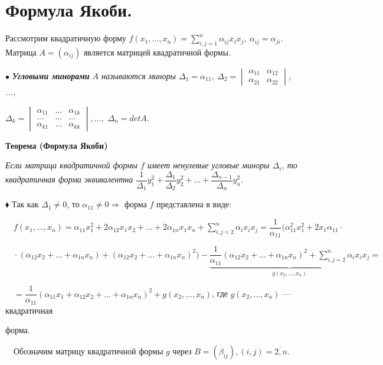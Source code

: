 \documentclass[a4paper, 12pt]{report}
\begin{document}
	
	
	
	
	
	\section{Формула Якоби.}
	
	\quad\;Рассмотрим квадратичную форму $f(x_1,...,x_n) =\sum\limits^n_{i,j=1}\alpha_{ij}x_ix_j,\ \alpha_{ij} = \alpha_{ji}.$ Матрица $A = (\alpha_{ij})$ является матрицей квадратичной формы.
	
	$\bullet$\textit{\textbf{ Угловыми минорами} $A$ называются миноры $\Delta_1 = \alpha_{11},\ \Delta_2 = \begin{vmatrix} \alpha_{11} & \alpha_{12}\\ \alpha_{21} & \alpha_{22} \end{vmatrix}$, ...,}
	
	\quad$\Delta_k = \begin{vmatrix} \alpha_{11} & ... & \alpha_{1k}\\ ...&...&... \\ \alpha_{k1} & ... & \alpha_{kk} \end{vmatrix}, ...,$ $\Delta_n = det A$.
	\par\bigskip
	\textbf{Теорема (Формула Якоби)}
	
	\textit{Если матрица квадратичной формы $f$ имеет ненулевые угловые миноры $\Delta_i$, то квадратичная форма эквивалентна $\dfrac{1}{\Delta_1}y_1^2+\dfrac{\Delta_1}{\Delta_2}y_2^2+...+\dfrac{\Delta_{n-1}}{\Delta_n}y_n^2$}.
	\par\bigskip
	$\blacklozenge$ Так как $\Delta_1 \ne 0$, то $\alpha_{11}\ne0\Rightarrow$ форма $f$ представлена в виде:
	
	$\quad f(x_1,...,x_n) = \alpha_{11}x_1^2 + 2\alpha_{12}x_1x_2 + ... + 2\alpha_{1n} x_1 x_n + \sum\limits^n_{i,j=2}\alpha_{i}x_ix_j = \dfrac{1}{\alpha_{11}}(\alpha_{11}^2x_1^2 + 2x_1\alpha_{11}\cdot$
	
	$\quad\cdot(\alpha_{12}x_2 + ... + \alpha_{1n}x_n) + (\alpha_{12}x_2 + ... + \alpha_{1n}x_n)^2) - \underbrace{\dfrac{1}{\alpha_{11}}(\alpha_{12}x_2 + ... + \alpha_{1n}x_n)^2 + \sum\limits^n_{i,j=2}\alpha_{i}x_ix_j}_{g(x_2,...,x_n)} =$
	
	$\quad=\dfrac{1}{\alpha_{11}}(\alpha_{11}x_1 + \alpha_{12}x_2 + ... + \alpha_{1n}x_n)^2 +  g(x_2,...,x_n)$, где $g(x_2,...,x_n)$ --- квадратичная\par\quad форма.
	
	$\quad$Обозначим матрицу квадратичной формы $g$ через $B = (\beta_{ij}), (i,j) = \overline{2,n}$.
	
\end{document}
